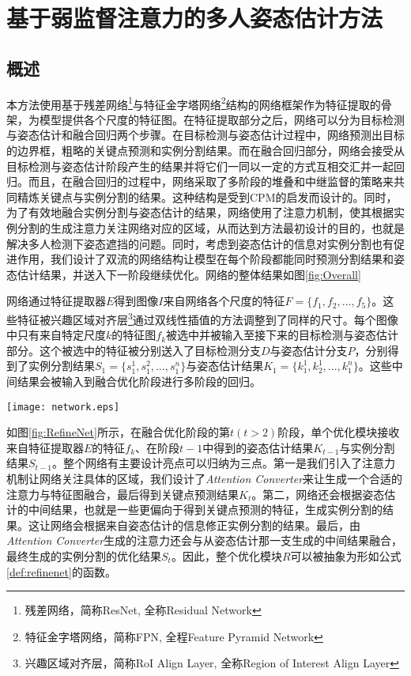 \chapter{基于弱监督注意力的多人姿态估计方法}
\label{cha:method}

\section{概述}
\label{sec:methodoverview}
本方法使用基于残差网络\footnote{残差网络，简称ResNet, 全称Residual Network}与特征金字塔网络\footnote{特征金字塔网络，简称FPN, 全程Feature Pyramid Network}结构的网络框架作为特征提取的骨架，为模型提供各个尺度的特征图。在特征提取部分之后，网络可以分为目标检测与姿态估计和融合回归两个步骤。在目标检测与姿态估计过程中，网络预测出目标的边界框，粗略的关键点预测和实例分割结果。而在融合回归部分，网络会接受从目标检测与姿态估计阶段产生的结果并将它们一同以一定的方式互相交汇并一起回归。而且，在融合回归的过程中，网络采取了多阶段的堆叠和中继监督的策略来共同精炼关键点与实例分割的结果。这种结构是受到CPM\cite{wei2016convolutional}的启发而设计的。同时，为了有效地融合实例分割与姿态估计的结果，网络使用了注意力机制，使其根据实例分割的生成注意力关注网络对应的区域，从而达到方法最初设计的目的，也就是解决多人检测下姿态遮挡的问题。同时，考虑到姿态估计的信息对实例分割也有促进作用，我们设计了双流的网络结构让模型在每个阶段都能同时预测分割结果和姿态估计结果，并送入下一阶段继续优化。网络的整体结果如图\ref{fig:Overall}

网络通过特征提取器$E$得到图像$I$来自网络各个尺度的特征$F=\{f_1, f_2, ..., f_5\}$。这些特征被兴趣区域对齐层\footnote{兴趣区域对齐层，简称RoI Align Layer, 全称Region of Interest Align Layer}通过双线性插值的方法调整到了同样的尺寸。每个图像中只有来自特定尺度$k$的特征图$f_k$被选中并被输入至接下来的目标检测与姿态估计部分。这个被选中的特征被分别送入了目标检测分支$D$与姿态估计分支$P$，分别得到了实例分割结果$S_1=\{s_1^1, s_1^2, ..., s_1^n\}$与姿态估计结果$K_1=\{k_1^1, k_2^1, ..., k_1^n\}$。这些中间结果会被输入到融合优化阶段进行多阶段的回归。

\begin{figure*}[htbp]	
	\centering
	\texttt{[image: network.eps]}
	\caption{网络整体结构}
	\label{fig:Overall}
\end{figure*}

如图\ref{fig:RefineNet}所示，在融合优化阶段的第$t(t>2)$阶段，单个优化模块接收来自特征提取器$E$的特征$f_k$、在阶段$t-1$中得到的姿态估计结果$K_{t-1}$与实例分割结果$S_{t-1}$。整个网络有主要设计亮点可以归纳为三点。第一是我们引入了注意力机制让网络关注具体的区域，我们设计了\textit{Attention Converter}来让生成一个合适的注意力与特征图融合，最后得到关键点预测结果$K_t$。第二，网络还会根据姿态估计的中间结果，也就是一些更偏向于得到关键点预测的特征，生成实例分割的结果。这让网络会根据来自姿态估计的信息修正实例分割的结果。最后，由\textit{Attention Converter}生成的注意力还会与从姿态估计那一支生成的中间结果融合，最终生成的实例分割的优化结果$S_t$。因此，整个优化模块$R$可以被抽象为形如公式\eqref{def:refinenet}的函数。


